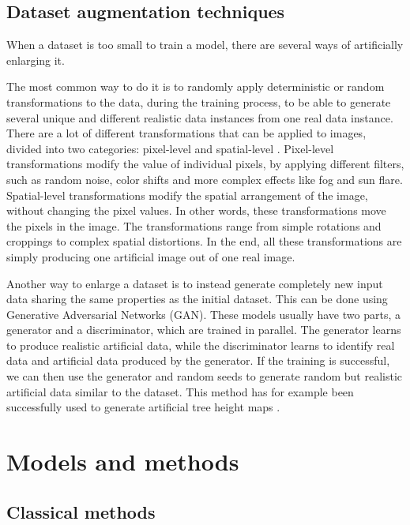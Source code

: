 \documentclass[
]{report}
\begin{document}
\subsection{Dataset augmentation
techniques}\label{dataset-augmentation-techniques}

When a dataset is too small to train a model, there are several ways of
artificially enlarging it.

The most common way to do it is to randomly apply deterministic or
random transformations to the data, during the training process, to be
able to generate several unique and different realistic data instances
from one real data instance. There are a lot of different
transformations that can be applied to images, divided into two
categories: pixel-level and spatial-level \autocite{albumentations}.
Pixel-level transformations modify the value of individual pixels, by
applying different filters, such as random noise, color shifts and more
complex effects like fog and sun flare. Spatial-level transformations
modify the spatial arrangement of the image, without changing the pixel
values. In other words, these transformations move the pixels in the
image. The transformations range from simple rotations and croppings to
complex spatial distortions. In the end, all these transformations are
simply producing one artificial image out of one real image.

Another way to enlarge a dataset is to instead generate completely new
input data sharing the same properties as the initial dataset. This can
be done using Generative Adversarial Networks (GAN). These models
usually have two parts, a generator and a discriminator, which are
trained in parallel. The generator learns to produce realistic
artificial data, while the discriminator learns to identify real data
and artificial data produced by the generator. If the training is
successful, we can then use the generator and random seeds to generate
random but realistic artificial data similar to the dataset. This method
has for example been successfully used to generate artificial tree
height maps \autocite{gan_data_augment}.

\section{Models and methods}\label{models-and-methods}

\subsection{Classical methods}\label{classical-methods}
\end{document}
